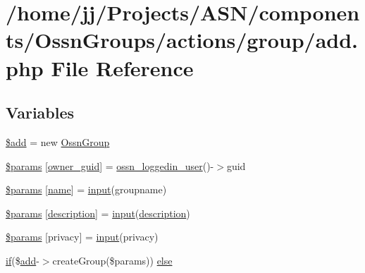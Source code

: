 \hypertarget{components_2_ossn_groups_2actions_2group_2add_8php}{}\section{/home/jj/\+Projects/\+A\+S\+N/components/\+Ossn\+Groups/actions/group/add.php File Reference}
\label{components_2_ossn_groups_2actions_2group_2add_8php}
\subsection*{Variables}
\begin{DoxyCompactItemize}
\item 
\hyperlink{components_2_ossn_groups_2actions_2group_2add_8php_a76aeb354fc71a358526ea9fbd7aae7a4}{\$add} = new \hyperlink{class_ossn_group}{Ossn\+Group}
\item 
\hyperlink{components_2_ossn_groups_2actions_2group_2add_8php_a55cf2c96ea79c172d62fc56177c1da24}{\$params} \mbox{[}\textquotesingle{}\hyperlink{user_8php_a307051fefc937afd02c509c55646f50b}{owner\+\_\+guid}\textquotesingle{}\mbox{]} = \hyperlink{ossn_8lib_8users_8php_aa3c8068d0e6638b414d6a2f6c62565b8}{ossn\+\_\+loggedin\+\_\+user}()-\/$>$guid
\item 
\hyperlink{components_2_ossn_groups_2actions_2group_2add_8php_a6c54f7ac094b1a3ef47b977e7dbe6f4c}{\$params} \mbox{[}\textquotesingle{}\hyperlink{user_8php_a765af5e9671743530143a6d3670fd9a6}{name}\textquotesingle{}\mbox{]} = \hyperlink{ossn_8lib_8input_8php_a64ebee98b041c4f75f71ed3cd73cc8ed}{input}(\textquotesingle{}groupname\textquotesingle{})
\item 
\hyperlink{components_2_ossn_groups_2actions_2group_2add_8php_aafea17cf6bee6d7d0438786e422c0ef3}{\$params} \mbox{[}\textquotesingle{}\hyperlink{components_2_ossn_wall_2actions_2wall_2post_2edit_8php_a7f60fcaa72b0968e6b6bd7d819fa6fd9}{description}\textquotesingle{}\mbox{]} = \hyperlink{ossn_8lib_8input_8php_a64ebee98b041c4f75f71ed3cd73cc8ed}{input}(\textquotesingle{}\hyperlink{components_2_ossn_wall_2actions_2wall_2post_2edit_8php_a7f60fcaa72b0968e6b6bd7d819fa6fd9}{description}\textquotesingle{})
\item 
\hyperlink{components_2_ossn_groups_2actions_2group_2add_8php_af21dea2cca3a782b46ee6a9bb5cea4e7}{\$params} \mbox{[}\textquotesingle{}privacy\textquotesingle{}\mbox{]} = \hyperlink{ossn_8lib_8input_8php_a64ebee98b041c4f75f71ed3cd73cc8ed}{input}(\textquotesingle{}privacy\textquotesingle{})
\item 
\hyperlink{jquery_8tokeninput_8js_ad8dd46a3cbc004569e34401e9e71771a}{if}(\$\hyperlink{theme_8min_8js_a79ed6f45c867c160601f70dfa5ec2f95}{add}-\/$>$create\+Group(\$params)) \hyperlink{components_2_ossn_groups_2actions_2group_2add_8php_acb0306354a182376f95de74a57635f77}{else}
\end{DoxyCompactItemize}


